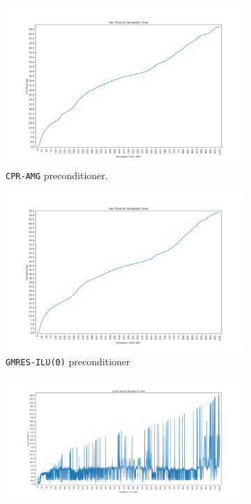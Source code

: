 \begin{figure}
\centering
\begin{subfigure}{.5\textwidth}
  \centering
  \includegraphics[width=1.1\linewidth]{figures/case9/cpr/cpu_time.png_reduced.png}
  \caption{\texttt{CPR-AMG} preconditioner.}
	\label{case9_cpu_cpr}
\end{subfigure}%
\begin{subfigure}{.5\textwidth}
  \centering
  \includegraphics[width=1.1\linewidth]{figures/case9/ilu/cpu_time.png_reduced.png}
  \caption{\texttt{GMRES-ILU(0)} preconditioner}
	\label{case9_cpu_ilu}
\end{subfigure}
\begin{subfigure}{.5\textwidth}
  \centering
  \includegraphics[width=1.1\linewidth]{figures/case9/cpr/its_time.png_reduced.png}

\end{subfigure}
\end{figure}

